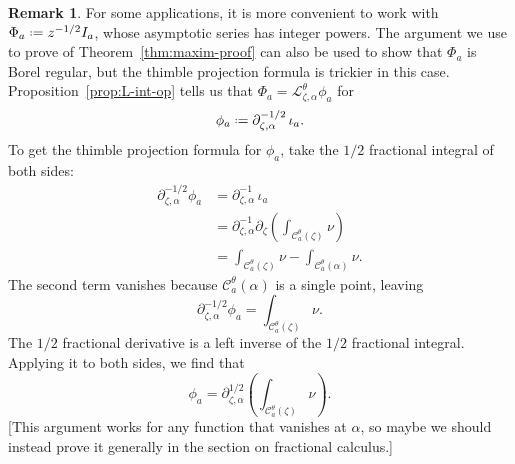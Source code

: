 \documentclass{article}
\newcommand{\fracderiv}[3]{\partial^{#1}_{#2, #3}}
\newcommand*{\defeq}{\mathrel{\vcenter{\baselineskip0.5ex \lineskiplimit0pt
                     \hbox{\scriptsize.}\hbox{\scriptsize.}}}%
                     =}
\newcommand{\laplace}{\mathcal{L}}
\theoremstyle{definition}
\newtheorem{remark}[definition]{Remark}
\theoremstyle{plain}
\newenvironment{todo}{\color{Coral}}{\color{black}}
\begin{document}
\begin{remark}\label{rmk:1/2-deriv}
For some applications, it is more convenient to work with $\Phi_a \defeq z^{-1/2} I_a$, whose asymptotic series has integer powers. The argument we use to prove of Theorem~\ref{thm:maxim-proof} can also be used to show that $\Phi_a$ is Borel regular, but the thimble projection formula is trickier in this case. Proposition~\ref{prop:L-int-op} tells us that $\Phi_a = \laplace^\theta_{\zeta, \alpha} \phi_a$ for
\[\phi_a \defeq \fracderiv{-1/2}{\zeta}{\alpha}\,\iota_a. \]
To get the thimble projection formula for $\phi_a$, take the $1/2$ fractional integral of both sides:
\begin{align*}
    \fracderiv{-1/2}{\zeta}{\alpha} \phi_a & = \fracderiv{-1}{\zeta}{\alpha} \, \iota_a \\
    & = \fracderiv{-1}{\zeta}{\alpha} \partial_\zeta \left( \int_{\mathcal{C}_a^\theta(\zeta)}\nu \right) \\
    & = \int_{\mathcal{C}_a^\theta(\zeta)}\nu - \int_{\mathcal{C}_a^\theta(\alpha)}\nu.
\end{align*}
The second term vanishes because $\mathcal{C}_a^\theta(\alpha)$ is a single point, leaving
\[ \fracderiv{-1/2}{\zeta}{\alpha} \phi_a = \int_{\mathcal{C}_a^\theta(\zeta)}\nu. \]
The $1/2$ fractional derivative is a left inverse of the $1/2$ fractional integral. Applying it to both sides, we find that
\begin{equation}\label{eqn:formula--1/2} \phi_a = \fracderiv{1/2}{\zeta}{\alpha} \left( \int_{\mathcal{C}_a^\theta(\zeta)}\nu \right).\end{equation}
\begin{todo}[This argument works for any function that vanishes at $\alpha$, so maybe we should instead prove it generally in the section on fractional calculus.]\end{todo}
\end{remark}
\end{document}
